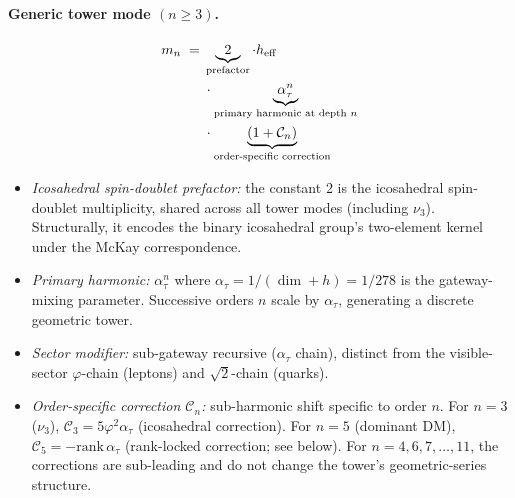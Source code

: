 ﻿\documentclass[reprint,amsmath,amssymb,aps,prd,longbibliography,floatfix]{revtex4-2}
\begin{document}
\paragraph{Generic tower mode $(n \geq 3)$.}
\begin{align*}
m_n \;=\;& \underbrace{2}_{\text{prefactor}} \cdot h_{\rm eff} \\
        &\cdot \underbrace{\alpha_\tau^n}_{\text{primary harmonic at depth }n} \\
        &\cdot \underbrace{(1 + \mathcal{C}_n)}_{\text{order-specific correction}}
\end{align*}
\begin{itemize}
\item \emph{Icosahedral spin-doublet prefactor:} the constant $2$ is
the icosahedral spin-doublet multiplicity, shared across all tower
modes (including $\nu_3$). Structurally, it encodes the binary
icosahedral group's two-element kernel under the McKay correspondence.
\item \emph{Primary harmonic:} $\alpha_\tau^n$ where $\alpha_\tau =
1/(\dim+h) = 1/278$ is the gateway-mixing parameter. Successive orders
$n$ scale by $\alpha_\tau$, generating a discrete geometric tower.
\item \emph{Sector modifier:} sub-gateway recursive ($\alpha_\tau$
chain), distinct from the visible-sector $\varphi$-chain (leptons)
and $\sqrt{2}$-chain (quarks).
\item \emph{Order-specific correction $\mathcal{C}_n$:} sub-harmonic
shift specific to order $n$. For $n = 3$ ($\nu_3$),
$\mathcal{C}_3 = 5\varphi^2 \alpha_\tau$ (icosahedral correction). For
$n = 5$ (dominant DM), $\mathcal{C}_5 = -\text{rank}\,\alpha_\tau$
(rank-locked correction; see below). For $n = 4, 6, 7, \ldots, 11$,
the corrections are sub-leading and do not change the tower's
geometric-series structure.
\end{itemize}
\end{document}
